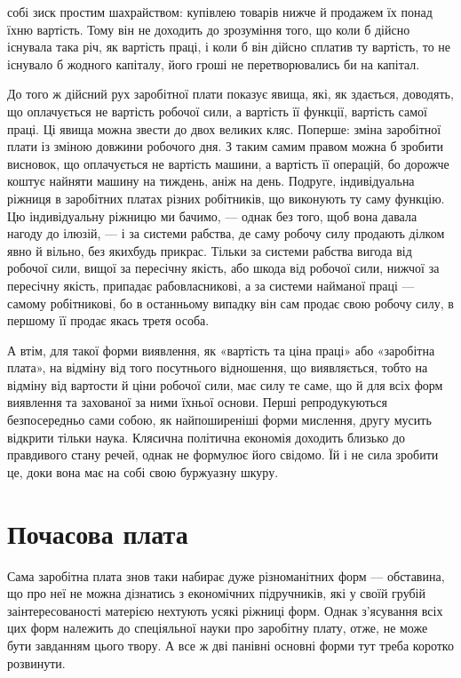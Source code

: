\parcont{}  %
собі зиск простим шахрайством: купівлею товарів нижче й продажем
їх понад їхню вартість. Тому він не доходить до зрозуміння
того, що коли б дійсно існувала така річ, як вартість праці, і
коли б він дійсно сплатив ту вартість, то не існувало б жодного
капіталу, його гроші не перетворювались би на капітал.

До того ж дійсний рух заробітної плати показує явища, які,
як здається, доводять, що оплачується не вартість робочої
сили, а вартість її функції, вартість самої праці. Ці явища можна
звести до двох великих кляс. Поперше: зміна заробітної плати
із зміною довжини робочого дня. З таким самим правом можна б
зробити висновок, що оплачується не вартість машини, а вартість
її операцій, бо дорожче коштує найняти машину на тиждень,
аніж на день. Подруге, індивідуальна ріжниця в заробітних
платах різних робітників, що виконують ту саму функцію. Цю індивідуальну
ріжницю ми бачимо, — однак без того, щоб вона давала
нагоду до ілюзій, — і за системи рабства, де саму робочу силу
продають ділком явно й вільно, без якихбудь прикрас. Тільки за
системи рабства вигода від робочої сили, вищої за пересічну якість,
або шкода від робочої сили, нижчої за пересічну якість, припадає
рабовласникові, а за системи найманої праці — самому
робітникові, бо в останньому випадку він сам продає свою робочу
силу, в першому її продає якась третя особа.

А втім, для такої форми виявлення, як «вартість та ціна праці»
або «заробітна плата», на відміну від того посутнього відношення,
що виявляється, тобто на відміну від вартости й ціни робочої
сили, має силу те саме, що й для всіх форм виявлення та захованої
за ними їхньої основи. Перші репродукуються безпосередньо
сами собою, як найпоширеніші форми мислення, другу мусить
відкрити тільки наука. Клясична політична економія доходить
близько до правдивого стану речей, однак не формулює його
свідомо. Їй і не сила зробити це, доки вона має на собі свою буржуазну
шкуру.

\section{Почасова плата}

Сама заробітна плата знов таки набирає дуже різноманітних
форм — обставина, що про неї не можна дізнатись з економічних
підручників, які у своїй грубій заінтересованості матерією нехтують
усякі ріжниці форм. Однак з’ясування всіх цих форм
належить до спеціяльної науки про заробітну плату, отже, не
може бути завданням цього твору. А все ж дві панівні основні
форми тут треба коротко розвинути.

